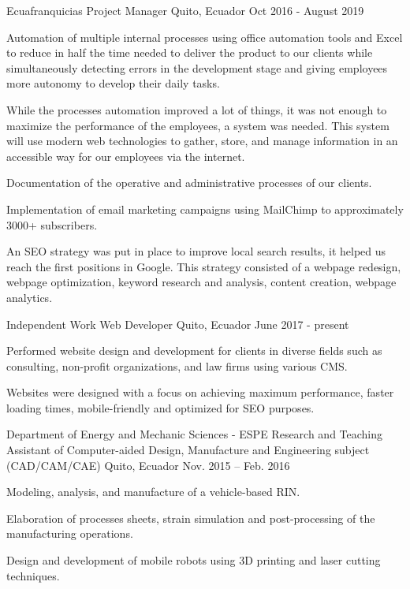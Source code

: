 
\begin{cventries}

  \cventry
    {Ecuafranquicias}
    {Project Manager}
    {Quito, Ecuador}
    {Oct 2016 - August 2019}
    {
      \begin{cvitems}
        \item {Automation of multiple internal processes using oﬀice automation tools and Excel to reduce in half the time needed to deliver the product to our clients while simultaneously detecting errors in the development stage and giving employees more autonomy to develop their daily tasks.}
        \item {While the processes automation improved a lot of things, it was not enough to maximize the performance of the employees, a system was needed. This system will use modern web technologies to gather, store, and manage information in an accessible way for our employees via the internet.}
        \item {Documentation of the operative and administrative processes of our clients.}
        \item {Implementation of email marketing campaigns using MailChimp to approximately 3000+ subscribers.}
        \item {An SEO strategy was put in place to improve local search results, it helped us reach the first positions in Google. This strategy consisted of a webpage redesign, webpage optimization, keyword research and analysis, content creation, webpage analytics.}
      \end{cvitems}
    }

    \cventry
      {Independent Work}
      {Web Developer}
      {Quito, Ecuador}
      {June 2017 - present}
      {
        \begin{cvitems}
          \item {Performed website design and development for clients in diverse fields such as consulting, non-profit organizations, and law firms using various CMS.}
          \item {Websites were designed with a focus on achieving maximum performance, faster loading times, mobile-friendly and optimized for SEO purposes.}
        \end{cvitems}
      }

  \cventry
    {Department of Energy and Mechanic Sciences - ESPE}
    {Research and Teaching Assistant of Computer-aided Design, Manufacture and Engineering subject (CAD/CAM/CAE)	}
    {Quito, Ecuador}
    {Nov. 2015 – Feb. 2016}
    {
      \begin{cvitems}
        \item {Modeling, analysis, and manufacture of a vehicle-based RIN.}
        \item {Elaboration of processes sheets, strain simulation and post-processing of the manufacturing operations.}
        \item {Design and development of mobile robots using 3D printing and laser cutting techniques.}
      \end{cvitems}
    }


\end{cventries}
